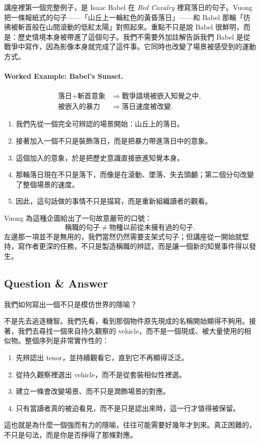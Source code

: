 講座裡第一個完整例子，是 Isaac Babel 在 \textit{Red Cavalry} 裡寫落日的句子。Vuong 把一條報紙式的句子——「山丘上一輪紅色的黃昏落日」——和 Babel 那輪「彷彿被斬首般在山間滾動的低紅太陽」對照起來。重點不只是說 Babel 很鮮明，而是：歷史情境本身被帶進了這個句子。我們不需要外加註解告訴我們 Babel 是從戰爭中寫作，因為影像本身就完成了這件事。它同時也改變了場景被感受到的運動方式。

\paragraph{Worked Example: Babel's Sunset.}
\begin{align}
\text{落日} + \text{斬首意象} &\Longrightarrow \text{戰爭語境被嵌入知覺之中},\\
\text{被嵌入的暴力} &\Longrightarrow \text{落日速度被改變}.
\end{align}
\begin{enumerate}
\item 我們先從一個完全可辨認的場景開始：山丘上的落日。
\item 接著加入一個不只是裝飾落日，而是把暴力帶進落日中的意象。
\item 這個加入的意象，於是把歷史意識直接嵌進知覺本身。
\item 那輪落日現在不只是落下，而像是在滾動、墜落、失去頭顱；第二個分句改變了整個場景的速度。
\item 因此，這句話做的事情不只是描寫，而是重新組織讀者的觀看。
\end{enumerate}

Vuong 為這種企圖給出了一句故意嚴苛的口號：
\begin{equation}
\text{稱職的句子} \neq \text{物種以前從未擁有過的句子}.
\end{equation}
左邊那一項並不是無用的，我們當然仍然需要支架式句子；但講座從一開始就堅持，寫作者更深的任務，不只是製造稱職的辨認，而是讓一個新的知覺事件得以發生。

\subsection{Question \& Answer}

我們如何寫出一個不只是模仿世界的隱喻？

不是先去追逐機智。我們先看，看到那個物件原先現成的名稱開始顯得不夠用。接著，我們去尋找一個來自持久觀察的 vehicle，而不是一個現成、被大量使用的相似物。整個序列是非常實作性的：
\begin{enumerate}
\item 先辨認出 tenor，並持續觀看它，直到它不再顯得泛泛。
\item 從持久觀察裡選出 vehicle，而不是從套裝相似性裡選。
\item 建立一條會改變場景、而不只是潤飾場景的對應。
\item 只有當讀者真的被迫看見，而不是只是認出來時，這一行才值得被保留。
\end{enumerate}
這也就是為什麼一個強而有力的隱喻，往往可能需要好幾年才到來。真正困難的，不只是句法，而是你是否掙得了那條對應。

